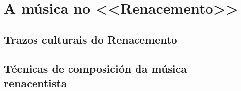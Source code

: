 %
\section{A música no <<Renacemento>> } 


\subsection*{Trazos culturais do Renacemento}


\subsection*{Técnicas de composición da música renacentista}


